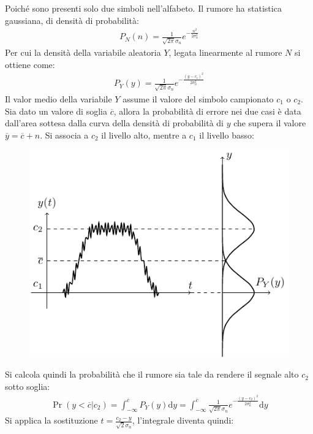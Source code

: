 \documentclass{article}
\newcommand{\df}{\mathrm{d}}
\numberwithin{equation}{subsection}
\begin{document}
Poiché sono presenti solo due simboli nell'alfabeto. 
Il rumore ha statistica gaussiana, di densità di probabilità:
\begin{gather*}
    P_N(n)=\displaystyle\frac{1}{\sqrt{2\pi}\sigma_n}e^{-\frac{n^2}{2\sigma_n^2}}
\end{gather*}
Per cui la densità della variabile aleatoria $Y$, legata linearmente al rumore $N$ si ottiene come:
\begin{gather*}
    P_Y(y)=\displaystyle\frac{1}{\sqrt{2\pi}\sigma_n}e^{-\frac{(y-c_{i})^2}{2\sigma_n^2}}    
\end{gather*}
Il valor medio della variabile $Y$ assume il valore del simbolo campionato $c_1$ o $c_2$. 
Sia dato un valore di soglia $\overline{c}$, allora la probabilità di errore nei due casi è data dall'area sottesa dalla curva della densità di probabilità di $y$ che 
supera il valore $\overline{y}=\overline{c}+n$. Si associa a $c_2$ il livello alto, mentre a $c_1$ il livello basso:
\begin{figure}[H]%
    \centering
    \includegraphics{rumore-soglia.pdf}%
\end{figure}
Si calcola quindi la probabilità che il rumore sia tale da rendere il segnale alto $c_2$ sotto soglia:
\begin{gather*}
    \Pr(y<\overline{c}|c_2)=\displaystyle\int_{-\infty}^{\overline{c}}P_Y(y)\df y=\int_{-\infty}^{\overline{c}}\frac{1}{\sqrt{2\pi}\sigma_n}e^{-\frac{(y-c_{2})^2}{2\sigma_n^2}}\df y
\end{gather*}
Si applica la sostituzione $t=\displaystyle\frac{c_2-y}{\sqrt{2}\sigma_n}$, l'integrale diventa quindi:
\end{document}
